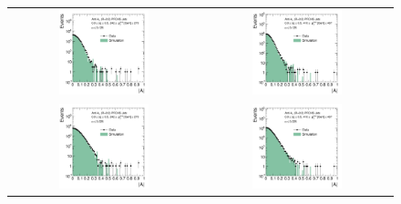 \begin{figure}[!tp]
  \centering
  \begin{tabular}{cc}
                \includegraphics[width=0.49\textwidth]{figures/AsymmHistos_Eta0_pt4_alpha1_final_nominal_v4.pdf} &
                \includegraphics[width=0.49\textwidth]{figures/AsymmHistos_Eta0_pt9_alpha1_final_nominal_v4.pdf} \\ 
                \includegraphics[width=0.49\textwidth]{figures/AsymmHistos_Eta0_pt4_alpha5_final_nominal_v4.pdf} &
                \includegraphics[width=0.49\textwidth]{figures/AsymmHistos_Eta0_pt9_alpha5_final_nominal_v4.pdf}

\end{tabular}
\end{figure}
